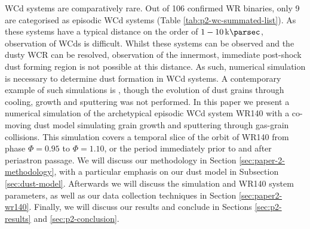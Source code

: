 \documentclass[fleqn,usenatbib]{mnras}
\begin{document}
\begin{table}
  \centering
  \caption[Confirmed WCd systems]{WCd systems with a known spectral type and dust formation type from the Galactic Wolf Rayet Catalogue \citep{rossloweSpatialDistributionGalactic2015}. Systems with uncertain spectral types are not included, while systems labelled ``d'' are included within the ``persistent'' category for their associated spectral type.}
  \label{tab:p2-wc-summated-list}
\end{table}

WCd systems are comparatively rare.
Out of 106 confirmed WR binaries, only 9 are categorised as episodic WCd systems
(Table \ref{tab:p2-wc-summated-list}).
As these systems have a typical distance on the order of $1-10 \, \si{\kilo\parsec}$, observation of WCds is difficult.
Whilst these systems can be observed and the dusty WCR can be resolved, observation of the innermost, immediate post-shock dust forming region is not possible at this distance.
As such, numerical simulation is necessary to determine dust formation in WCd systems.
A contemporary example of such simulations is \cite{hendrix_pinwheels_2016}, though the evolution of dust grains through cooling, growth and sputtering was not performed.
In this paper we present a numerical simulation of the archetypical episodic WCd system WR140 with a co-moving dust model simulating grain growth and sputtering through gas-grain collisions.
This simulation covers a temporal slice of the orbit of WR140 from phase $\Phi = 0.95$ to $\Phi = 1.10$, or the period immediately prior to and after periastron passage.
We will discuss our methodology in Section \ref{sec:paper-2-methodology}, with a particular emphasis on our dust model in Subsection \ref{sec:dust-model}.
Afterwards we will discuss the simulation and WR140 system parameters, as well as our data collection techniques in Section \ref{sec:paper2-wr140}.
Finally, we will discuss our results and conclude in Sections \ref{sec:p2-results} and \ref{sec:p2-conclusion}.
\end{document}
